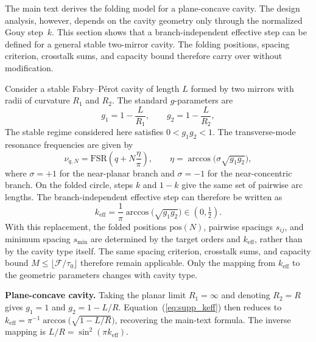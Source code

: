 \documentclass{optica-article}%
\begin{document}
The main text derives the folding model for a plane-concave cavity. The design analysis, however, depends on the cavity geometry only through the normalized Gouy step~$k$. This section shows that a branch-independent effective step can be defined for a general stable two-mirror cavity. The folding positions, spacing criterion, crosstalk sums, and capacity bound therefore carry over without modification.

Consider a stable Fabry--P\'{e}rot cavity of length $L$ formed by two mirrors with radii of curvature $R_1$ and $R_2$. The standard $g$-parameters are
\begin{equation}
g_1 = 1-\frac{L}{R_1}, \qquad g_2 = 1-\frac{L}{R_2},
\label{eq:supp_g_params}
\end{equation}
The stable regime considered here satisfies $0<g_1 g_2<1$. The transverse-mode resonance frequencies are given by~\cite{Kogelnik1966,Siegman1986}
\begin{equation}
\nu_{q,N} = \mathrm{FSR}\!\left(q + N\frac{\eta}{\pi}\right), \qquad \eta = \arccos\!\bigl(\sigma\sqrt{g_1 g_2}\bigr),
\label{eq:supp_gen_resonance}
\end{equation}
where $\sigma=+1$ for the near-planar branch and $\sigma=-1$ for the near-concentric branch. On the folded circle, steps $k$ and $1{-}k$ give the same set of pairwise arc lengths. The branch-independent effective step can therefore be written as
\begin{equation}
k_{\mathrm{eff}} = \frac{1}{\pi}\arccos\!\bigl(\sqrt{g_1 g_2}\bigr) \in (0,\tfrac{1}{2}).
\label{eq:supp_keff}
\end{equation}
With this replacement, the folded positions $\mathrm{pos}(N)$, pairwise spacings $s_{ij}$, and minimum spacing $s_{\min}$ are determined by the target orders and $k_{\mathrm{eff}}$, rather than by the cavity type itself. The same spacing criterion, crosstalk sums, and capacity bound $M\le\lfloor\mathcal{F}/\tau_0\rfloor$ therefore remain applicable. Only the mapping from $k_{\mathrm{eff}}$ to the geometric parameters changes with cavity type.

\medskip\noindent\textbf{Plane-concave cavity.}\quad
Taking the planar limit $R_1=\infty$ and denoting $R_2=R$ gives $g_1=1$ and $g_2=1-L/R$. Equation~(\ref{eq:supp_keff}) then reduces to $k_{\mathrm{eff}}=\pi^{-1}\arccos\!\bigl(\sqrt{1-L/R}\bigr)$, recovering the main-text formula. The inverse mapping is $L/R=\sin^2(\pi k_{\mathrm{eff}})$.
\end{document}
